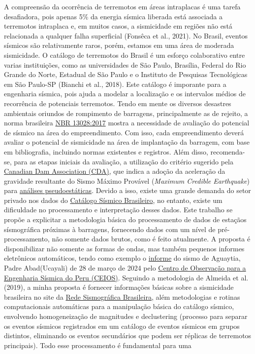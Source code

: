 \documentclass[10pt,a4paper,oneside]{book}
\begin{document}
A compreensão da ocorrência de terremotos em áreas intraplacas é uma tarefa desafiadora, pois apenas 5\% da energia sísmica liberada está associada a terremotos intraplaca e, em muitos casos, a sismicidade em regiões não está relacionada a qualquer falha superficial (Fonsêca et al., 2021). No Brasil, eventos sísmicos são relativamente raros, porém, estamos em uma área de moderada sismicidade. O catálogo de terremotos do Brasil é um esforço colaborativo entre varias instituições, como as universidades de São Paulo, Brasília, Federal do Rio Grande do Norte, Estadual de São Paulo e o Instituto de Pesquisas Tecnológicas em São Paulo-SP (Bianchi et al., 2018). Este catálogo é imporante para a engenharia sísmica, pois ajuda a modelar a localização e os intervalos médios de recorrência de potenciais terremotos. Tendo em mente os diversos desastres ambientais oriundos de rompimento de barragens, principalmente as de rejeito, a norma brasileira \href{https://pdfcoffee.com/download/nbr-13028-pdf-free.html}{NBR 13028:2017} mostra a necessidade de avaliação do potencial de sísmico na área do empreendimento. Com isso, cada empreendimento deverá avaliar o potencial de sismicidade na área de implantação da barragem, com base em bibliografia, incluindo normas existentes e registros. Além disso, recomenda-se, para as etapas iniciais da avaliação, a utilização do critério sugerido pela \href{https://www.knightpiesold.com/sites/en/assets/File/CDA\%202016\%20-\%20Seismic\%20and\%20Structural\%20Stability\%20Analysis\%20for\%20Increased\%20Ground\%20Motions\%20at\%20the\%20Corra\%20Linn\%20Dam.pdf}{Canadian Dam Association (CDA)}, que indica a adoção da aceleração da gravidade resultante do Sismo Máximo Provável (\textit{Maximum Credible Earthquake}) para \href{https://www.maxwell.vrac.puc-rio.br/9532/9532_3.PDF}{análises pseudoestáticas}. Devido a isso, existe uma grande demanda do setor privado nos dados do \href{https://moho.iag.usp.br/eq/bulletin/}{Catálogo Sísmico Brasileiro}, no entanto, existe um dificuldade no processamento e interpretação desses dados. Este trabalho se propõe a explicitar a metodologia básica do processamento de dados de estaçãos sísmográfica próximas à barragens, fornecendo dados com um nível de pré-processamento, não somente dados brutos, como é feito atualmente. A proposta é disponibilizar não somente as formas de ondas, mas também pequenos informes eletrônicos automáticos, tendo como exemplo o \href{https://www.cismid.uni.edu.pe/wp-content/uploads/2024/03/CISMID_20240328_110115_AGUAYTIA.pdf}{informe} do sismo de Aguaytia, Padre Abad(Ucayali) de 28 de março de 2024 pelo \href{https://www.cismid.uni.edu.pe/ceois/red/}{Centro de Observação para a Engenharia Sísmica do Peru (CEIOS)}. Seguindo a metodologia de Almeida et al. (2019), a minha proposta é fornecer informações básicas sobre a sismicidade brasileira no site da \href{www.rsbr.on.br}{Rede Sismográfica Brasileira}, além metodologias e rotinas computacionais automáticas para a manipulação básica do catálogo sísmico, envolvendo homogeneização de magnitudes e declustering (processo para separar os eventos sísmicos registrados em um catálogo de eventos sísmicos em grupos distintos, eliminando os eventos secundários que podem ser réplicas de terremotos principais). Todo esse processamento é fundamental para uma 
\end{document}

